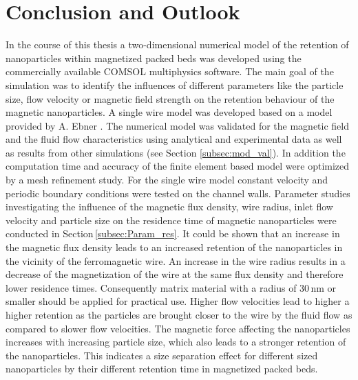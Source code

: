 
\chapter{Conclusion and Outlook}
\label{ch:Conclusion}

In the course of this thesis a two-dimensional numerical model of the retention of nanoparticles within magnetized packed beds was developed using the commercially available COMSOL multiphysics software. The main goal of the simulation was to identify the influences of different parameters like the particle size, flow velocity or magnetic field strength on the retention behaviour of the magnetic nanoparticles. 
A single wire model was developed based on a model provided by A. Ebner \cite{choomphon2017simulation}. The numerical model was validated for the magnetic field and the fluid flow characteristics using analytical and experimental data as well as results from other simulations (see Section \ref{subsec:mod_val}). In addition the computation time and accuracy of the finite element based model were optimized by a mesh refinement study. For the single wire model constant velocity and periodic boundary conditions were tested on the channel walls. Parameter studies investigating the influence of the magnetic flux density, wire radius, inlet flow velocity and particle size on the residence time of magnetic nanoparticles were conducted in Section\,\ref{subsec:Param_res}. It could be shown that an increase in the magnetic flux density leads to an increased retention of the nanoparticles in the vicinity of the ferromagnetic wire. An increase in the wire radius results in a decrease of the magnetization of the wire at the same flux density and therefore lower residence times. Consequently matrix material with a radius of 30\,nm or smaller should be applied for practical use. Higher flow velocities lead to higher a higher retention as the particles are brought closer to the wire by the fluid flow as compared to slower flow velocities. The magnetic force affecting the nanoparticles increases with increasing particle size, which also leads to a stronger retention of the nanoparticles. This indicates a size separation effect for different sized nanoparticles by their different retention time in magnetized packed beds.

